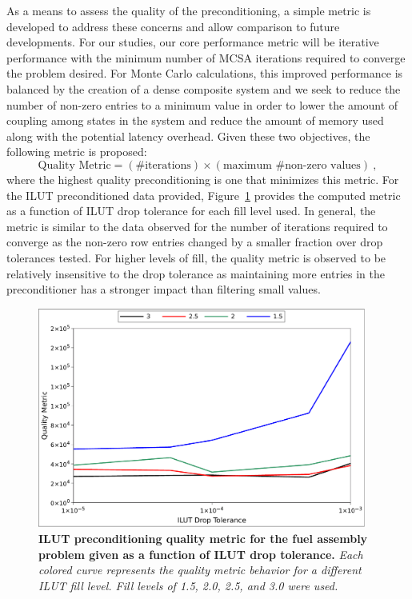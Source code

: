 As a means to assess the quality of the preconditioning, a simple
metric is developed to address these concerns and allow comparison to
future developments. For our studies, our core performance metric will
be iterative performance with the minimum number of MCSA iterations
required to converge the problem desired. For Monte Carlo
calculations, this improved performance is balanced by the creation of
a dense composite system and we seek to reduce the number of non-zero
entries to a minimum value in order to lower the amount of coupling
among states in the system and reduce the amount of memory used
along with the potential latency overhead. Given these two objectives,
the following metric is proposed:
\begin{equation}
  \text{Quality Metric} = (\text{\# iterations}) \times (\text{maximum
    \# non-zero values})\:,
\end{equation}
where the highest quality preconditioning is one that minimizes this
metric. For the ILUT preconditioned data provided,
Figure~\ref{fig:ilut_quality} provides the computed metric as a
function of ILUT drop tolerance for each fill level used. In general,
the metric is similar to the data observed for the number of
iterations required to converge as the non-zero row entries changed by
a smaller fraction over drop tolerances tested. For higher levels of
fill, the quality metric is observed to be relatively insensitive to
the drop tolerance as maintaining more entries in the preconditioner
has a stronger impact than filtering small values.

\begin{figure}[t!]
  \begin{center}
    \includegraphics[width=4.25in]{chapters/spn_equations/ilut_quality.pdf}
  \end{center}
  \caption{\textbf{ILUT preconditioning quality metric for the fuel
      assembly problem given as a function of ILUT drop tolerance.}
    \textit{Each colored curve represents the quality metric behavior
      for a different ILUT fill level. Fill levels of 1.5, 2.0, 2.5,
      and 3.0 were used.}}
  \label{fig:ilut_quality}
\end{figure}


